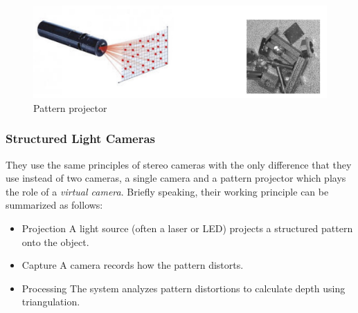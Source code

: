 \begin{figure}
    \centering
    \includegraphics[scale=0.7]{img/pattern_projector.png}
    \caption{Pattern projector}
\end{figure}

\subsubsection{Structured Light Cameras}
They use the same principles of stereo cameras with the only difference that they use instead of two cameras, a single camera and a pattern projector which plays the role of a \textit{virtual camera}. Briefly speaking, their working principle can be summarized as follows: 
\begin{itemize}
    \itemsep-0.3em
    \item \textsf{Projection}  A light source (often a laser or LED) projects a structured pattern onto the object.
    \item \textsf{Capture} A camera records how the pattern distorts.
    \item \textsf{Processing} The system analyzes pattern distortions to calculate depth using triangulation.
\end{itemize}



